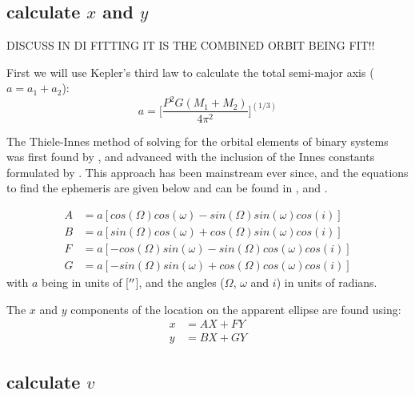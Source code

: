 \documentclass[10pt,preprint]{aastex}
\begin{document}
\subsection{calculate $x$ and $y$}
{\color{red} DISCUSS IN  DI FITTING IT IS THE COMBINED ORBIT BEING FIT!!}

First we will use Kepler's third law to calculate the total semi-major axis ($a=a_1+a_2$):
\begin{equation}\label{eq:K3}
a = \bigg[\frac{P^2G(M_1+M_2)}{4\pi^2} \bigg]^{(1/3)}
\end{equation}

The Thiele-Innes method of solving for the orbital elements of binary systems was first found by \citet{Thiele}, and advanced with the inclusion of the Innes constants formulated by \citet{Van}.  This approach has been mainstream ever since, and the equations to find the ephemeris are given below and can be found in \citet{aitken}, \citet{binnendijk} and \citet{heintz}.

\begin{subequations}
\begin{align}\label{eq:24a}
A& = a[cos(\Omega)cos(\omega)-sin(\Omega)sin(\omega)cos(i)]\\
\label{eq:24b}
B& = a[sin(\Omega)cos(\omega)+cos(\Omega)sin(\omega)cos(i)]\\
\label{eq:24c}
F& = a[-cos(\Omega)sin(\omega)-sin(\Omega)cos(\omega)cos(i)]\\
\label{eq:24d}
G& = a[-sin(\Omega)sin(\omega)+cos(\Omega)cos(\omega)cos(i)]
\end{align}
\end{subequations}
with $a$ being in units of [$\mbox{$^{\prime\prime}$}$], and the angles ($\Omega$, $\omega$ and $i$) in units of radians.

The $x$ and $y$ components of the location on the apparent ellipse are found using:
\begin{subequations}
\begin{align}\label{eq:28-1a}
x& = AX+FY\\
\label{eq:28-1b}
y& = BX + GY
\end{align}
\end{subequations}


\subsection{calculate $v$}
\end{document}
